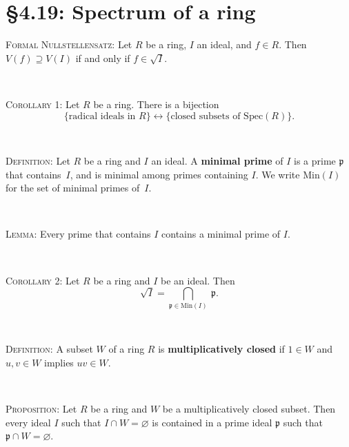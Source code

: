 \documentclass[12pt]{amsart}
\newcommand{\p}{\mathfrak{p}}
\newcommand{\1}{\mathbbm{1}}
\newcommand{\showsol}[1]{\def\displaysol{#1}}
\begin{document}
\showsol{0}
	
	\thispagestyle{empty}
	
	\section*{\S4.19: Spectrum of a ring}	

\begin{framed}




\noindent \textsc{Formal Nullstellensatz:} Let $R$ be a ring,  $I$ an ideal, and $f\in R$. Then $V(f) \supseteq V(I)$ if and only if $f\in \sqrt{I}$.



\

\noindent \textsc{Corollary 1:} Let $R$ be a ring. There is a bijection
\[ \{ \text{radical ideals in $R$}\}  \longleftrightarrow \{ \text{closed subsets of $\mathrm{Spec}(R)$}\}.\]

\

\noindent \textsc{Definition:} Let $R$ be a ring and $I$ an ideal. A \textbf{minimal prime} of $I$ is a prime $\p$ that contains~$I$, and is minimal among primes containing $I$. We write $\mathrm{Min}(I)$ for the set of minimal primes of~$I$.


\

\noindent \textsc{Lemma:} Every prime that contains $I$ contains a minimal prime of $I$.

\

\noindent \textsc{Corollary 2:} Let $R$ be a ring and $I$ be an ideal. Then
\[ \sqrt{I} = \bigcap_{\p \in \mathrm{Min}(I)} \ \p.\]


\


\noindent \textsc{Definition:} A subset $W$ of a ring $R$ is \textbf{multiplicatively closed} if $1\in W$ and $u,v\in W$ implies $uv\in W$.

\

\noindent \textsc{Proposition:} Let $R$ be a ring and $W$ be a multiplicatively closed subset. Then every ideal $I$ such that $I\cap W = \varnothing$ is contained in a prime ideal $\p$ such that $\p \cap W = \varnothing$.
\end{framed}
\end{document}
